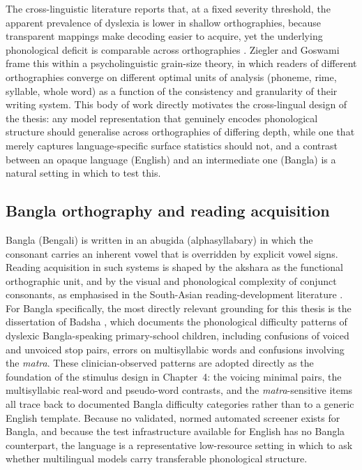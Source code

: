 The cross-linguistic literature reports that, at a fixed severity threshold, the apparent prevalence of dyslexia is lower in shallow orthographies, because transparent mappings make decoding easier to acquire, yet the underlying phonological deficit is comparable across orthographies \cite{ziegler2005reading,wagner2020prevalence}. Ziegler and Goswami \cite{ziegler2005reading} frame this within a psycholinguistic grain-size theory, in which readers of different orthographies converge on different optimal units of analysis (phoneme, rime, syllable, whole word) as a function of the consistency and granularity of their writing system. This body of work directly motivates the cross-lingual design of the thesis: any model representation that genuinely encodes phonological structure should generalise across orthographies of differing depth, while one that merely captures language-specific surface statistics should not, and a contrast between an opaque language (English) and an intermediate one (Bangla) is a natural setting in which to test this.

\subsection{Bangla orthography and reading acquisition}

Bangla (Bengali) is written in an abugida (alphasyllabary) in which the consonant carries an inherent vowel that is overridden by explicit vowel signs. Reading acquisition in such systems is shaped by the akshara as the functional orthographic unit, and by the visual and phonological complexity of conjunct consonants, as emphasised in the South-Asian reading-development literature \cite{nag2014dyslexia,nag2017indian}. For Bangla specifically, the most directly relevant grounding for this thesis is the dissertation of Badsha \cite{badsha2024mall}, which documents the phonological difficulty patterns of dyslexic Bangla-speaking primary-school children, including confusions of voiced and unvoiced stop pairs, errors on multisyllabic words and confusions involving the \textit{matra}. These clinician-observed patterns are adopted directly as the foundation of the stimulus design in Chapter~4: the voicing minimal pairs, the multisyllabic real-word and pseudo-word contrasts, and the \textit{matra}-sensitive items all trace back to documented Bangla difficulty categories rather than to a generic English template. Because no validated, normed automated screener exists for Bangla, and because the test infrastructure available for English has no Bangla counterpart, the language is a representative low-resource setting in which to ask whether multilingual models carry transferable phonological structure.


